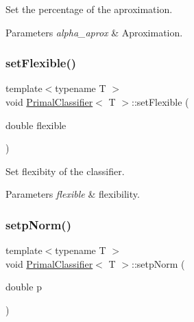 Set the percentage of the aproximation. 


\begin{DoxyParams}{Parameters}
{\em alpha\+\_\+aprox} & Aproximation. \\
\hline
\end{DoxyParams}
\mbox{\label{class_primal_classifier_a7e5c459cb4a377c794502cd9831ee095}} 
\subsubsection{\texorpdfstring{set\+Flexible()}{setFlexible()}}
{\footnotesize\ttfamily template$<$typename T $>$ \\
void \mbox{\hyperlink{class_primal_classifier}{Primal\+Classifier}}$<$ T $>$\+::set\+Flexible (\begin{DoxyParamCaption}\item[{double}]{flexible }\end{DoxyParamCaption})\hspace{0.3cm}{\ttfamily [inline]}}



Set flexibity of the classifier. 


\begin{DoxyParams}{Parameters}
{\em flexible} & flexibility. \\
\hline
\end{DoxyParams}
\mbox{\label{class_primal_classifier_ad0c3b7577b6c11da7394105dd2002f1d}} 
\subsubsection{\texorpdfstring{setp\+Norm()}{setpNorm()}}
{\footnotesize\ttfamily template$<$typename T $>$ \\
void \mbox{\hyperlink{class_primal_classifier}{Primal\+Classifier}}$<$ T $>$\+::setp\+Norm (\begin{DoxyParamCaption}\item[{double}]{p }\end{DoxyParamCaption})\hspace{0.3cm}{\ttfamily [inline]}}



